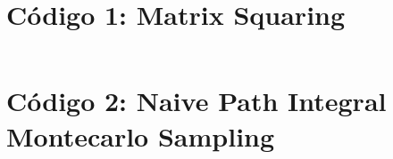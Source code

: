 \documentclass[%
 reprint,
 amsmath,amssymb,
 aps,
 pra,
]{revtex4-2}
\begin{document}
\newpage



\appendix

\begin{widetext}

\section{Código 1: Matrix Squaring\label{appx:codigo_matrix_squaring}}

\inputminted[linenos,breaklines]{python}{code_1.py}

\section{Código 2: Naive Path Integral Montecarlo Sampling\label{appx:codigo_temperatura_finita}}


\end{widetext}
\end{document}
